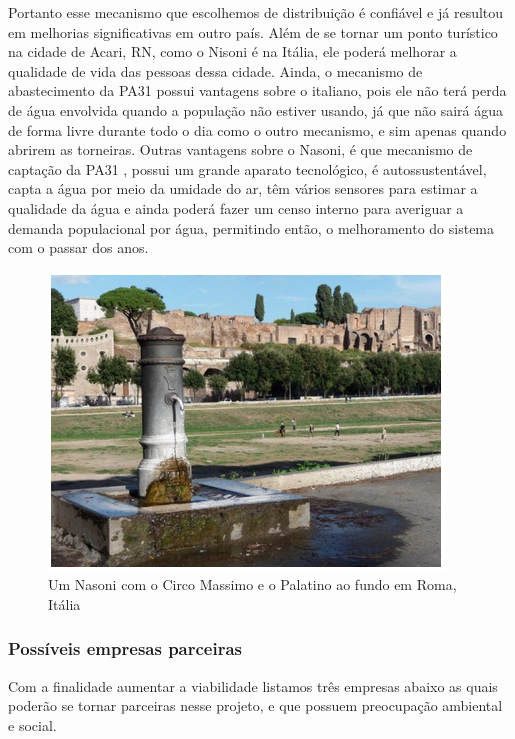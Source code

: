     Portanto esse mecanismo que escolhemos de distribuição é confiável e já resultou em melhorias significativas em outro país. Além de se tornar um ponto turístico na cidade de Acari, RN, como o Nisoni é na Itália, ele poderá melhorar a qualidade de vida das pessoas dessa cidade. Ainda, o mecanismo de abastecimento da PA31 possui vantagens sobre o italiano, pois ele não terá perda de água envolvida quando a população não estiver usando, já que não sairá água de forma livre durante todo o dia como o outro mecanismo, e sim apenas quando abrirem as torneiras. Outras vantagens sobre o Nasoni, é que mecanismo de captação da PA31 , possui um grande aparato tecnológico, é autossustentável, capta a água por meio da umidade do ar, têm vários sensores para estimar a qualidade da água e ainda poderá fazer um censo interno para averiguar a demanda populacional por água, permitindo então, o melhoramento do sistema com o passar dos anos.
    \FloatBarrier
	\begin{figure}[!htbp]
      \centering
      \includegraphics[scale=1]{editaveis/figuras/nasoni_italia}
      \caption[Um Nasoni com o Circo Massimo e o Palatino ao fundo em Roma, Itália ]
      {Um Nasoni com o Circo Massimo e o Palatino ao fundo em Roma, Itália  \cite{rodrigues}}
      \label{dimensionamento_nasoni}
    \end{figure}
    \FloatBarrier
    \subsubsection{Possíveis empresas parceiras}
      
      Com a finalidade aumentar a viabilidade listamos três empresas abaixo as quais poderão se tornar parceiras nesse projeto, e que possuem preocupação ambiental e social.
      
